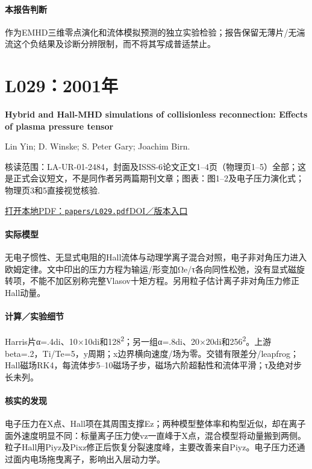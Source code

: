 \paragraph{本报告判断}作为EMHD三维零点演化和流体模拟预测的独立实验检验；报告保留无薄片/无湍流这个负结果及诊断分辨限制，而不将其写成普适禁止。

\section{L029：2001年}\label{paper:L029}

\textbf{Hybrid and Hall-MHD simulations of collisionless reconnection: Effects of plasma pressure tensor}\citep{L029}\

Lin Yin;  D. Winske;  S. Peter Gary;  Joachim Birn.

\textsf{核读范围：}LA-UR-01-2484，封面及ISSS-6论文正文1–4页（物理页1–5）全部；这是正式会议短文，不是同作者另两篇期刊文章；\textsf{图表：}图1–2及电子压力演化式；物理页3和5直接视觉核验.

\href{run:papers/L029.pdf}{打开本地PDF：\texttt{papers/L029.pdf}}\quad\href{https://digital.library.unt.edu/ark:/67531/metadc718188/}{DOI／版本入口}

\paragraph{实际模型}无电子惯性、无显式电阻的Hall流体与动理学离子混合对照，电子非对角压力进入欧姆定律。文中印出的压力方程为输运/形变加Ωe/τ各向同性松弛，没有显式磁旋转项，不能不加区别称完整Vlasov十矩方程。另用粒子估计离子非对角压力修正Hall动量。

\paragraph{计算／实验细节}Harris片α=.4di、10×10di和128\textsuperscript{2}；另一组α=.8di、20×20di和256\textsuperscript{2}。上游beta=.2，Ti/Te=5，y周期；x边界横向速度/场为零。交错有限差分/leapfrog；Hall磁场RK4，每流体步5–10磁场子步，磁场六阶超黏性和流体平滑；τ及绝对步长未列。

\paragraph{核实的发现}电子压力在X点、Hall项在其周围支撑Ez；两种模型整体率和构型近似，却在离子面外速度明显不同：标量离子压力使vz一直峰于X点，混合模型将动量搬到两侧。粒子Hall用Piyz及Pixz修正后恢复分裂速度峰，主要改善来自Piyz。电子压力还通过面内电场拖曳离子，影响出入层动力学。


